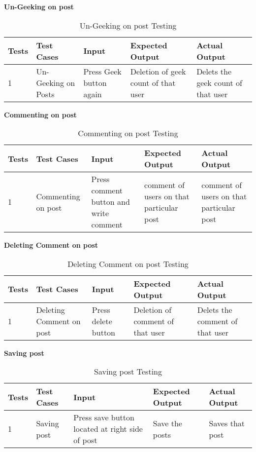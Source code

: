 \textbf{Un-Geeking on post}\\
\begin{table}[H]
    \caption{Un-Geeking on post Testing}
        \label{}
    \begin{tabular}{|p{0.3in}|p{1.3in}|p{1.3in}|p{1.3in}|p{1in}|}
        \hline
        Tests & Test Cases & Input &Expected Output & Actual Output \\
        \hline
            1 & Un-Geeking on Posts & Press Geek button again & Deletion of geek count of that user &Delets the geek count of that user \\
            \hline
\end{tabular}
\end{table}

\textbf{Commenting on post}\\
\begin{table}[H]
    \caption{Commenting on post Testing}
        \label{}
    \begin{tabular}{|p{0.3in}|p{1.3in}|p{1.3in}|p{1.3in}|p{1in}|}
        \hline
        Tests & Test Cases & Input &Expected Output & Actual Output \\
        \hline
            1 &Commenting on post & Press comment button and write comment & comment of users on that particular post & comment of users on that particular post \\
            \hline
\end{tabular}
\end{table}

\textbf{Deleting Comment on post}\\
\begin{table}[H]
    \caption{Deleting Comment on post Testing}
        \label{}
    \begin{tabular}{|p{0.3in}|p{1.3in}|p{1.3in}|p{1.3in}|p{1in}|}
        \hline
        Tests & Test Cases & Input &Expected Output & Actual Output \\
        \hline
            1 &Deleting Comment on post & Press delete button & Deletion of comment of that user& Delets the comment of that user \\
            \hline
\end{tabular}
\end{table}

\textbf{Saving post}\\
\begin{table}[H]
    \caption{Saving post Testing}
        \label{}
    \begin{tabular}{|p{0.3in}|p{1.3in}|p{1.3in}|p{1.3in}|p{1in}|}
        \hline
        Tests & Test Cases & Input &Expected Output & Actual Output \\
        \hline
            1 &Saving post & Press save button located at right side of post & Save the posts & Saves that post \\
            \hline
\end{tabular}
\end{table}

